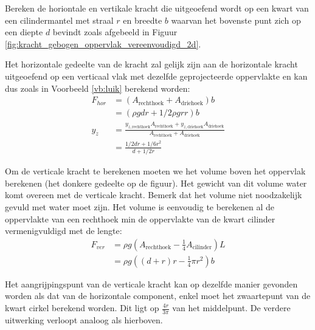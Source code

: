 \begin{voorbeeld}
	Bereken de horiontale en vertikale kracht die uitgeoefend wordt op een kwart van een cilindermantel met straal $r$ en breedte $b$ waarvan het bovenste punt zich op een diepte $d$ bevindt zoals afgebeeld in Figuur \ref{fig:kracht_gebogen_oppervlak_vereenvoudigd_2d}.

	Het horizontale gedeelte van de kracht zal gelijk zijn aan de horizontale kracht uitgeoefend op een verticaal vlak met dezelfde geprojecteerde oppervlakte en kan dus zoals in Voorbeeld \ref{vb:luik} berekend worden:
	\begin{align*}
		F_{hor} &= \left( A_{\text{rechthoek}} + A_{\text{driehoek}} \right) b\\
		        &= \left( \rho g d r + 1/2 \rho g r r \right) b \\
		y_z &= \frac{ y_{z,\text{rechthoek}} A_{\text{rechthoek}} + y_{z,\text{driehoek}} A_{\text{driehoek}}}{A_{\text{rechthoek}} + A_{\text{driehoek}}} \\
		    &= \frac{ 1/2 d r + 1/6 r^2}{d + 1/2 r}
	\end{align*}

	Om de verticale kracht te berekenen moeten we het volume boven het oppervlak berekenen (het donkere gedeelte op de figuur). Het gewicht van dit volume water komt overeen met de verticale kracht. Bemerk dat het volume niet noodzakelijk gevuld met water moet zijn. Het volume is eenvoudig te berekenen al de oppervlakte van een rechthoek min de oppervlakte van de kwart cilinder vermenigvuldigd met de lengte:
	\begin{align*}
		F_{ver} &= \rho g (A_{\text{rechthoek}} - \frac{1}{4}A_{\text{cilinder}}) L\\
		        &= \rho g \left( (d+r)r - \frac{1}{4} \pi r^2 \right) b
	\end{align*}

	Het aangrijpingspunt van de verticale kracht kan op dezelfde manier gevonden worden als dat van de horizontale component, enkel moet het zwaartepunt van de kwart cirkel berekend worden. Dit ligt op $\frac{4r}{3\pi}$ van het middelpunt. De verdere uitwerking verloopt analoog als hierboven.
\end{voorbeeld}

